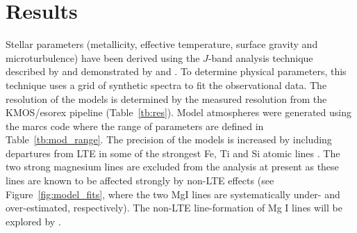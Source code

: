 \documentclass[iop]{emulateapj}
\begin{document}




\section{Results} %
\label{sec:results}

Stellar parameters
(metallicity, effective temperature, surface gravity and microturbulence)
have been derived using the $J$-band analysis technique described by
\cite{2010MNRAS.407.1203D} and demonstrated by
\cite{Davies-prep} and
\cite{2014ApJ...788...58G}.
To determine physical parameters, this technique uses a grid of synthetic spectra to fit the observational data.
The resolution of the models is determined by the measured resolution from the KMOS/esorex pipeline (Table~\ref{tb:res}).
Model atmospheres were generated using the {\sc marcs} code
\citep{2008A&A...486..951G} where the range of parameters are defined in
Table~\ref{tb:mod_range}.
The precision of the models is increased by including departures from LTE in some of the strongest Fe, Ti and Si atomic lines
\citep{2012ApJ...751..156B,2013ApJ...764..115B}.
The two strong magnesium lines are excluded from the analysis at present as these lines are known to be affected strongly by non-LTE effects
(see Figure~\ref{fig:model_fits}, where the two MgI lines are systematically under- and over-estimated, respectively).
The non-LTE line-formation of Mg I lines will be explored by
\cite{Bergemann-prep}.
\end{document}

